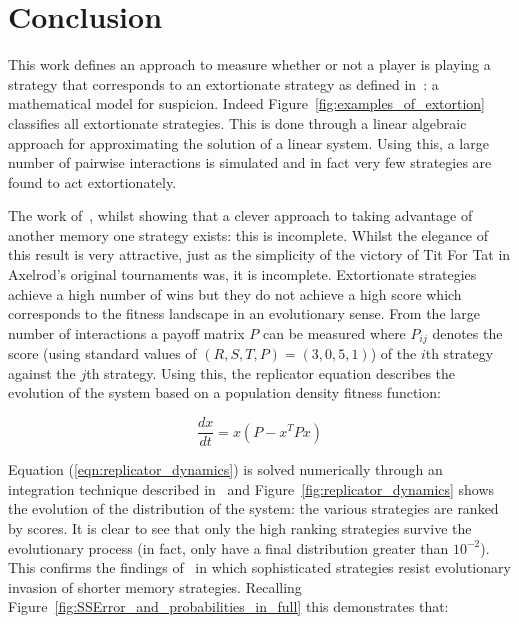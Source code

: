 \documentclass[a4paper]{article}
\begin{document}
\section{Conclusion}\label{sec:conclusion}

This work defines an approach to measure whether or not a player is playing a
strategy that corresponds to an extortionate strategy as defined
in~\cite{Press2012}: a mathematical model for suspicion. Indeed
Figure~\ref{fig:examples_of_extortion} classifies all extortionate strategies.
This is done through a linear algebraic approach for approximating the solution
of a linear system. Using this, a large number of pairwise interactions is
simulated and in fact very few strategies are found to act extortionately.

The work of~\cite{Press2012}, whilst showing that a clever approach to taking
advantage of another memory one strategy exists: this is incomplete. Whilst the
elegance of this result is very attractive, just as the simplicity of the
victory of Tit For Tat in Axelrod's original tournaments was, it is incomplete.
Extortionate strategies achieve a high number of wins but they do not
achieve a high score which corresponds to the fitness landscape in an
evolutionary sense. From the large number of interactions a payoff matrix \(P\)
can be measured where \(P_{ij}\) denotes the score (using standard values of
\((R, S, T, P) = (3, 0, 5, 1)\)) of the \(i\)th strategy
against the \(j\)th strategy. Using this, the replicator equation
describes the evolution of the system based on a population density fitness
function:

\begin{equation}\label{eqn:replicator_dynamics}
    \frac{dx}{dt} = x(P-x^TP x)
\end{equation}

Equation (\ref{eqn:replicator_dynamics}) is solved numerically through an
integration technique described in~\cite{Petzold1983} and
Figure~\ref{fig:replicator_dynamics} shows the evolution of the distribution of
the system: the various strategies are ranked by scores. It is clear to see that
only the high ranking strategies survive the evolutionary process (in fact,
only 
have a final distribution greater than \(10 ^ {-2}\)). This confirms the
findings of~\cite{Moran1707} in which sophisticated strategies resist
evolutionary invasion of shorter memory strategies. Recalling
Figure~\ref{fig:SSError_and_probabilities_in_full} this demonstrates that:
\end{document}
